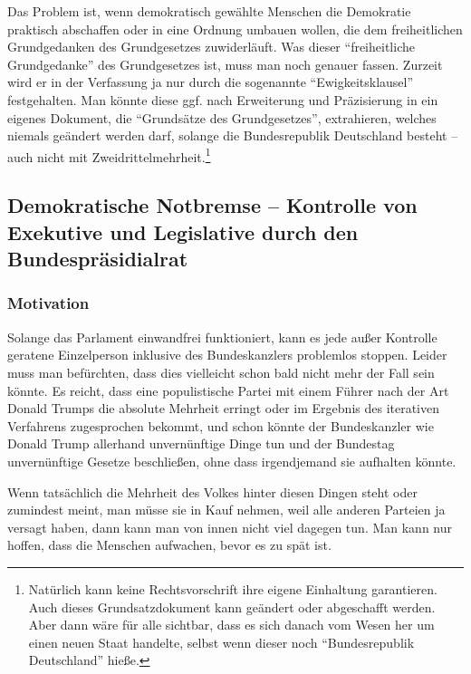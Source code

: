 Das Problem ist, wenn demokratisch gewählte Menschen die Demokratie praktisch abschaffen oder in eine Ordnung umbauen wollen, die dem freiheitlichen Grundgedanken des Grundgesetzes zuwiderläuft.
Was dieser \enquote{freiheitliche Grundgedanke} des Grundgesetzes ist, muss man noch genauer fassen.
Zurzeit wird er in der Verfassung ja nur durch die sogenannte \enquote{Ewigkeitsklausel} festgehalten.
Man könnte diese ggf. nach Erweiterung und Präzisierung in ein eigenes Dokument, die \enquote{Grundsätze des Grundgesetzes}, extrahieren, welches niemals geändert werden darf, solange die Bundesrepublik Deutschland besteht -- auch nicht mit Zweidrittelmehrheit.\footnote{Natürlich kann keine Rechtsvorschrift ihre eigene Einhaltung garantieren. Auch dieses Grundsatzdokument kann geändert oder abgeschafft werden. Aber dann wäre für alle sichtbar,
dass es sich danach vom Wesen her um einen neuen Staat handelte, selbst wenn dieser noch \enquote{Bundesrepublik Deutschland} hieße.}

\subsection{Demokratische Notbremse -- Kontrolle von Exekutive und Legislative durch den Bundespräsidialrat}\label{subsec:demokratische_notbremse}
\subsubsection{Motivation}\label{subsubsec:demokratische_notbremse_motivation}
Solange das Parlament einwandfrei funktioniert, kann es jede außer Kontrolle geratene Einzelperson inklusive des Bundeskanzlers problemlos stoppen. Leider muss man befürchten, dass dies vielleicht schon bald nicht mehr der Fall sein könnte. Es reicht, dass eine populistische Partei mit einem Führer nach der Art Donald Trumps die absolute Mehrheit erringt oder im Ergebnis des iterativen Verfahrens zugesprochen bekommt, und schon könnte der Bundeskanzler wie Donald Trump allerhand unvernünftige Dinge tun und der Bundestag unvernünftige Gesetze beschließen, ohne dass irgendjemand sie aufhalten könnte.

Wenn tatsächlich die Mehrheit des Volkes hinter diesen Dingen steht oder zumindest meint, man müsse sie in Kauf nehmen, weil alle anderen Parteien ja versagt haben, dann kann man von innen nicht viel dagegen tun.
Man kann nur hoffen, dass die Menschen aufwachen, bevor es zu spät ist.

